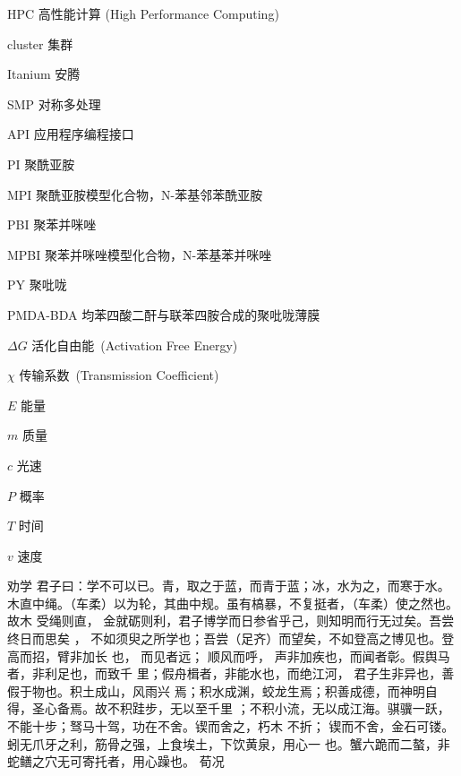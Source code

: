 \begin{denotation}

\item[HPC] 高性能计算 (High Performance Computing)
\item[cluster] 集群
\item[Itanium] 安腾
\item[SMP] 对称多处理
\item[API] 应用程序编程接口
\item[PI]	聚酰亚胺
\item[MPI]	聚酰亚胺模型化合物，N-苯基邻苯酰亚胺
\item[PBI]	聚苯并咪唑
\item[MPBI]	聚苯并咪唑模型化合物，N-苯基苯并咪唑
\item[PY]	聚吡咙
\item[PMDA-BDA]	均苯四酸二酐与联苯四胺合成的聚吡咙薄膜
\item[$\Delta G$]  	活化自由能~(Activation Free Energy)
\item [$\chi$] 传输系数~(Transmission Coefficient)
\item[$E$] 能量
\item[$m$] 质量
\item[$c$] 光速
\item[$P$] 概率
\item[$T$] 时间
\item[$v$] 速度
\item[劝学] 君子曰：学不可以已。青，取之于蓝，而青于蓝；冰，水为之，而寒于水。
木直中绳。（车柔）以为轮，其曲中规。虽有槁暴，不复挺者，（车柔）使之然也。故木
受绳则直， 金就砺则利，君子博学而日参省乎己，则知明而行无过矣。吾尝终日而思矣
，  不如须臾之所学也；吾尝（足齐）而望矣，不如登高之博见也。登高而招，臂非加长
也，  而见者远；  顺风而呼，  声非加疾也，而闻者彰。假舆马者，非利足也，而致千
里；假舟楫者，非能水也，而绝江河，  君子生非异也，善假于物也。积土成山，风雨兴
焉；积水成渊，蛟龙生焉；积善成德，而神明自得，圣心备焉。故不积跬步，无以至千里
；不积小流，无以成江海。骐骥一跃，不能十步；驽马十驾，功在不舍。锲而舍之，朽木
不折；  锲而不舍，金石可镂。蚓无爪牙之利，筋骨之强，上食埃土，下饮黄泉，用心一
也。蟹六跪而二螯，非蛇鳝之穴无可寄托者，用心躁也。\pozhehao{} 荀况
\end{denotation}
